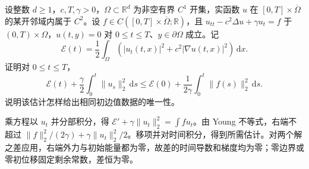 \begin{exercise}\label{b2:ex:14-damped-wave}
设整数 \(d\geq1\)，\(c,T,\gamma>0\)，\(\Omega\subset\mathbb R^d\) 为非空有界 \(C^1\) 开集，实函数 \(u\) 在 \([0,T]\times\overline\Omega\) 的某开邻域内属于 \(C^2\)。设 \(f\in C([0,T]\times\overline\Omega;\mathbb R)\)，且 \(u_{tt}-c^2\Delta u+\gamma u_t=f\) 于 \((0,T)\times\Omega\)，\(u(t,y)=0\) 对 \(0\leq t\leq T\)、\(y\in\partial\Omega\) 成立。记
\[
 \mathcal E(t)=\frac12\int_\Omega
            (|u_t(t,x)|^2+c^2|\nabla u(t,x)|^2)\,\mathrm{d}x.
\]
证明对 \(0\le t\le T\)，
\[\mathcal E(t)+\frac\gamma2\int_0^t\lVert u_s\rVert_2^2\,\mathrm ds
 \le\mathcal E(0)+\frac1{2\gamma}\int_0^t\lVert f(s)\rVert_2^2\,\mathrm ds.\]
说明该估计怎样给出相同初边值数据的唯一性。
\end{exercise}
\begin{solution}
乘方程以 \(u_t\) 并分部积分，得 \(\mathcal E'+\gamma\lVert u_t\rVert_2^2=\int fu_t\)。由 Young 不等式，右端不超过 \(\lVert f\rVert_2^2/(2\gamma)+\gamma\lVert u_t\rVert_2^2/2\)。移项并对时间积分，得到所需估计。对两个解之差应用，右端外力与初始能量都为零，故差的时间导数和梯度均为零；零边界或零初位移固定剩余常数，差恒为零。
\end{solution}

